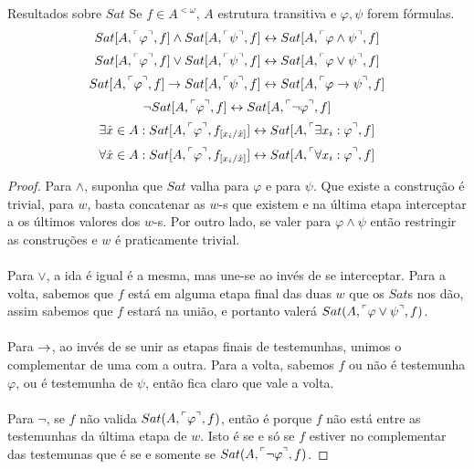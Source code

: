         \begin{lemma}{Resultados sobre $Sat$}
            Se $f\in A^{<\omega}$, $A$ estrutura transitiva e $\varphi,\psi$ forem fórmulas. 
            $$Sat[A,\FMLA{\varphi}, f]\land Sat[A,\FMLA{\psi}, f] \bim Sat[A,\FMLA{\varphi\land\psi}, f]$$
            $$Sat[A,\FMLA{\varphi}, f]\lor  Sat[A,\FMLA{\psi}, f] \bim Sat[A,\FMLA{\varphi\lor \psi}, f]$$
            $$Sat[A,\FMLA{\varphi}, f]\rar  Sat[A,\FMLA{\psi}, f] \bim Sat[A,\FMLA{\varphi\rar \psi}, f]$$
            $$\neg Sat[A,\FMLA{\varphi}, f]                       \bim Sat[A,\FMLA{\neg\varphi     }, f]$$
            $$\exists\hat x\in A: Sat[A,\FMLA{\varphi}, f_{[x_i\slash\hat x]}]\bim Sat[A,\FMLA{\exists x_i:\varphi}, f]$$
            $$\forall\hat x\in A: Sat[A,\FMLA{\varphi}, f_{[x_i\slash\hat x]}]\bim Sat[A,\FMLA{\forall x_i:\varphi}, f]$$
            \begin{proof}
                    Para $\land$, suponha que $Sat$ valha para $\varphi$ e para $\psi$. Que existe a construção é trivial, para $w$, 
                    basta concatenar as $w$-s que existem e na última etapa interceptar a os últimos valores dos $w$-s. Por outro 
                    lado, se valer para $\varphi\land\psi$ então restringir as construções e $w$ é praticamente trivial.
                \paragraph{}
                    Para $\lor$, a ida é igual é a mesma, mas une-se ao invés de se interceptar. Para a volta, sabemos que $f$ está 
                    em alguma etapa final das duas $w$ que os $Sat$s nos dão, assim sabemos que $f$ estará na união, e portanto 
                    valerá $Sat(A,\FMLA{\varphi\lor \psi}, f)$.
                \paragraph{}
                    Para $\rightarrow$, ao invés de se unir as etapas finais de testemunhas, unimos o complementar de uma com a outra. Para 
                    a volta, sabemos $f$ ou não é testemunha $\varphi$, ou é testemunha de $\psi$, então fica claro que vale a volta.
                \paragraph{}
                    Para $\neg$, se $f$ não valida $Sat(A,\FMLA{\varphi}, f)$, então é porque $f$ não está entre as testemunhas da 
                    última etapa de $w$. Isto é se e só se $f$ estiver no complementar das testemunas que é se e somente se   
                    $Sat(A,\FMLA{\neg\varphi}, f)$.

\end{proof}
\end{lemma}
